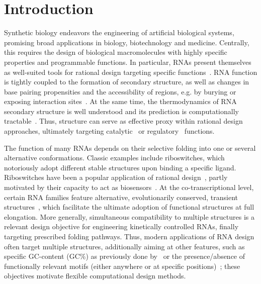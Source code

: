 \documentclass{bioinfo}
\newcommand{\parHead}[1]{\Final{\paragraph{#1}}}
\newcommand{\Final}[1]{\begingroup\color{red!70!black}#1\endgroup}
\renewcommand{\Final}[1]{}
\newcommand{\Nuc}[1]{{\sf #1}}
\newcommand{\Cb}{\Nuc{C}}
\newcommand{\Gb}{\Nuc{G}}
\newcommand{\GCb}{\Gb\Cb}
\begin{document}
\maketitle



\section{Introduction}
\parHead{Design, applications and motivation for multiple design.}Synthetic biology endeavors the engineering of artificial biological
systems, promising broad applications in biology, biotechnology and
medicine. Centrally, this requires the design of biological
macromolecules with highly specific properties and programmable functions.
In particular, RNAs present themselves as well-suited tools for
rational design targeting specific functions~\citep{Kushwaha2016}. RNA function is tightly
coupled to the formation of secondary structure, as well as changes in
base pairing propensities and the accessibility of regions, e.g. by
burying or exposing interaction sites~\citep{Rodrigo2014}. At the same time, the
thermodynamics of RNA secondary structure is well understood and its prediction is
computationally tractable~\citep{McCaskill1990}. Thus,  structure can serve as effective
proxy within rational design approaches, ultimately targeting catalytic~\citep{Zhang2013} or regulatory~\citep{Rodrigo2014} functions.

\parHead{Motivating multiple RNA design.} The function of many RNAs
depends on their selective folding into one or several alternative
conformations. Classic examples include riboswitches, which
notoriously adopt different stable structures upon binding a specific
ligand. Riboswitches have been a popular application of rational
design~\citep{Wachsmuth2013,Domin2017}, partly motivated by their
capacity to act as biosensors~\citep{Findeiss2017}. At the
co-transcriptional level, certain RNA families feature alternative,
evolutionarily conserved, transient structures~\citep{Zhu2013}, which
facilitate the ultimate adoption of functional structures at full
elongation.  More generally, simultaneous compatibility to multiple
structures is a relevant design objective for engineering kinetically
controlled RNAs, finally targeting prescribed folding pathways. Thus,
modern applications of RNA design often target multiple structures,
additionally aiming at other features, such as specific
\GCb-content (\GCb\%) as previously done by~\citet{Reinharz2013} or the presence/absence of
functionally relevant motifs (either anywhere or at specific
positions)~\citep{Zhou2013}; these objectives motivate flexible
computational design methods.
\end{document}
